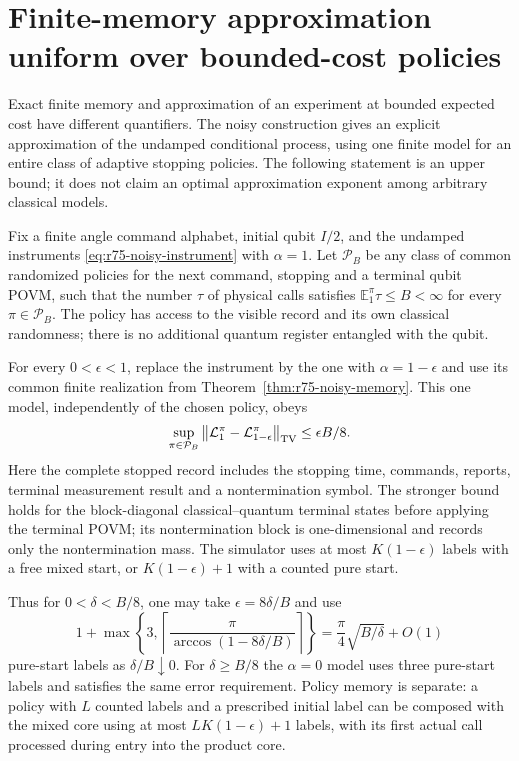 \section{Finite-memory approximation uniform over bounded-cost policies}
\label{sec:r75-stopped-approximation}

Exact finite memory and approximation of an experiment at bounded
expected cost have different quantifiers.  The noisy construction gives
an explicit approximation of the undamped conditional process, using one
finite model for an entire class of adaptive stopping policies.  The
following statement is an upper bound; it does not claim an optimal
approximation exponent among arbitrary classical models.

\begin{theorem}
\label{thm:r75-stopped-approximation}
Fix a finite angle command alphabet, initial qubit $I/2$, and the
undamped instruments \eqref{eq:r75-noisy-instrument} with $\alpha=1$.
Let $\mathcal P_B$ be any class of common randomized policies for the
next command, stopping and a terminal qubit POVM, such that the number
$\tau$ of physical calls satisfies
$\mathbb E_{1}^{\pi}\tau\le B<\infty$ for every $\pi\in\mathcal P_B$.
The policy has access to the visible record and its own classical
randomness; there is no additional quantum register entangled with the
qubit.

For every $0<\epsilon<1$, replace the instrument by the one with
$\alpha=1-\epsilon$ and use its common finite realization from
Theorem~\ref{thm:r75-noisy-memory}.  This one model, independently of the
chosen policy, obeys
\begin{equation}\label{eq:r75-stopped-tv}
 \sup_{\pi\in\mathcal P_B}
 \left\|\mathcal L_1^\pi-\mathcal L_{1-\epsilon}^\pi\right\|_{\rm TV}
 \le \epsilon B/8.
\end{equation}
Here the complete stopped record includes the stopping time, commands,
reports, terminal measurement result and a nontermination symbol.  The
stronger bound holds for the block-diagonal classical--quantum terminal
states before applying the terminal POVM; its nontermination block is
one-dimensional and records only the nontermination mass.
The simulator uses at most
$K(1-\epsilon)$ labels with a free mixed start, or
$K(1-\epsilon)+1$ with a counted pure start.

Thus for $0<\delta<B/8$, one may take $\epsilon=8\delta/B$ and use
\begin{equation}\label{eq:r75-approx-count}
 1+\max\left\{3,
       \left\lceil\frac\pi{\arccos(1-8\delta/B)}\right\rceil\right\}
   =\frac\pi4\sqrt{B/\delta}+O(1)
\end{equation}
pure-start labels as $\delta/B\downarrow0$.  For $\delta\ge B/8$ the
$\alpha=0$ model uses three pure-start labels and satisfies the same
error requirement.  Policy memory is separate: a policy with $L$
counted labels and a prescribed initial label can be composed with the
mixed core using at most $LK(1-\epsilon)+1$ labels, with its first actual
call processed during entry into the product core.
\end{theorem}
